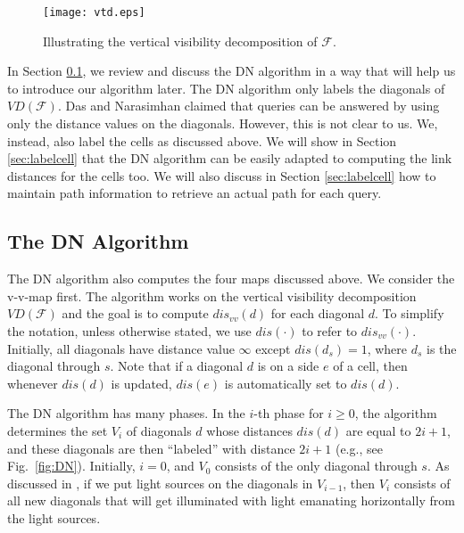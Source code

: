\documentclass[english,runningheads,11pt]{llncs-revised}
\def\calF{\mathcal{F}}
\newcommand{\vtd}{\mbox{$V\!D$}}
\begin{document}
\begin{figure}[t]
\begin{minipage}[t]{\linewidth}
\begin{center}
\texttt{[image: vtd.eps]}
\caption{\footnotesize Illustrating the vertical visibility
decomposition of $\calF$. }
\label{fig:vtd}
\end{center}
\end{minipage}
\vspace{-0.15in}
\end{figure}



In Section \ref{sec:DN}, we review and discuss the DN algorithm \cite{ref:DasGe91} in a way that will help us to introduce our algorithm later. The DN algorithm only labels the diagonals of $\vtd(\calF)$.
Das and Narasimhan \cite{ref:DasGe91} claimed that queries can be
answered by using only the distance values on the diagonals. However,
this is not clear to us. We, instead, also label the cells
as discussed above. We will show in Section \ref{sec:labelcell} that the DN algorithm can be easily
adapted to computing the link distances for the cells too. We will also discuss in Section \ref{sec:labelcell} how to maintain path information to retrieve an actual path for each query.


\subsection{The DN Algorithm}
\label{sec:DN}


The DN algorithm also computes the four maps discussed above. We consider the
v-v-map first. The algorithm works on the vertical visibility
decomposition $\vtd(\calF)$ and the goal is to compute $dis_{vv}(d)$ for each
diagonal $d$.
To simplify the notation, unless otherwise
stated, we use $dis(\cdot)$ to refer to $dis_{vv}(\cdot)$.
Initially, all diagonals have distance value
$\infty$ except $dis(d_s)=1$, where $d_s$ is the diagonal through $s$.
Note that if a diagonal $d$ is on a side $e$ of a cell, then
whenever $dis(d)$ is updated, $dis(e)$ is automatically set to $dis(d)$.

The DN algorithm has many phases. In the $i$-th phase for $i\geq 0$, the
algorithm determines the set $V_i$ of diagonals $d$ whose distances
$dis(d)$ are equal to $2i+1$, and these diagonals are then ``labeled''
with distance $2i+1$ (e.g., see Fig.~\ref{fig:DN}). Initially, $i=0$, and $V_0$ consists of
the only diagonal through $s$. As discussed in \cite{ref:DasGe91},
if we put light sources on the diagonals in $V_{i-1}$,
then $V_i$ consists of all new diagonals that will get illuminated with light emanating horizontally from the light sources.
\end{document}
